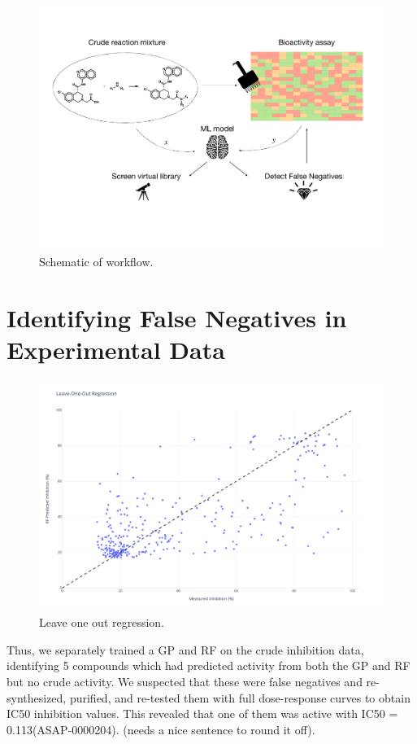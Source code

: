 \begin{figure}
    \centering
             \includegraphics[width=\textwidth]{Chapters/Crude/Figs/schematic.pdf}
        \caption{Schematic of workflow.}
        \label{fig:schematic}
    \end{figure}

\section{Identifying False Negatives in Experimental Data}
\begin{figure}
    \centering
             \includegraphics[width=\textwidth]{Chapters/Crude/Figs/rf.pdf}
        \caption{Leave one out regression.}
        \label{fig:leave-one-out}
    \end{figure}

Thus, we separately trained a GP and RF on the crude inhibition data, identifying 5 compounds which had predicted activity from both the GP and RF but no crude activity. We suspected that these were false negatives and re-synthesized, purified, and re-tested them with full dose-response curves to obtain IC50 inhibition values. This revealed that one of them was active with IC50 = 0.113\uM (ASAP-0000204). (needs a nice sentence to round it off).

